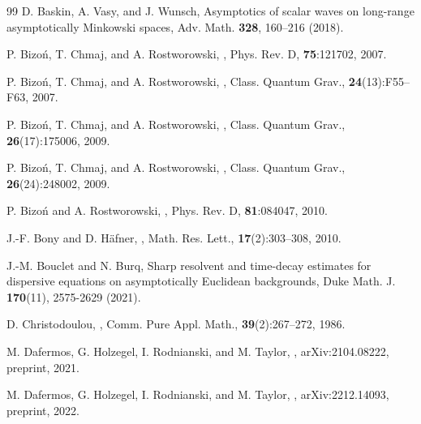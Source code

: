 \documentclass[10pt,a4paper,reqno]{amsart}
\theoremstyle{definition}
\theoremstyle{remark}
\numberwithin{equation}{section}
\begin{document}
\begin{thebibliography}{99}
 D. Baskin, A. Vasy, and J. Wunsch,
\newblock Asymptotics of scalar waves on long-range asymptotically Minkowski spaces,
\newblock Adv. Math. \textbf{328}, 160–216 (2018). 

 P. Bizoń, T. Chmaj, and A. Rostworowski, 
,
\newblock Phys. Rev. D, \textbf{75}:121702, 2007. %

 P. Bizoń, T. Chmaj, and A. Rostworowski, 
,
\newblock Class. Quantum Grav., \textbf{24}(13):F55--F63, 2007. %

 P. Bizoń, T. Chmaj, and A. Rostworowski, 
,
\newblock Class. Quantum Grav., \textbf{26}(17):175006, 2009. %

 P. Bizoń, T. Chmaj, and A. Rostworowski, 
,
\newblock Class. Quantum Grav., \textbf{26}(24):248002, 2009. %

 P. Bizoń and A. Rostworowski, 
,
\newblock Phys. Rev. D, \textbf{81}:084047, 2010. %

 J.-F. Bony and D. Häfner,
, 
\newblock Math. Res. Lett., \textbf{17}(2):303–308, 2010. %

 J.-M. Bouclet and N. Burq,
\newblock Sharp resolvent and time-decay estimates for dispersive equations on asymptotically Euclidean backgrounds,
\newblock Duke Math. J. \textbf{170}(11), 2575-2629 (2021). %

 D. Christodoulou, 
,
\newblock Comm. Pure Appl. Math., \textbf{39}(2):267--272, 1986.

 M. Dafermos, G. Holzegel, I. Rodnianski, and M. Taylor,
,
\newblock arXiv:2104.08222, preprint, 2021.

 M. Dafermos, G. Holzegel, I. Rodnianski, and M. Taylor,
,
\newblock arXiv:2212.14093, preprint, 2022.



\end{thebibliography}
\end{document}
